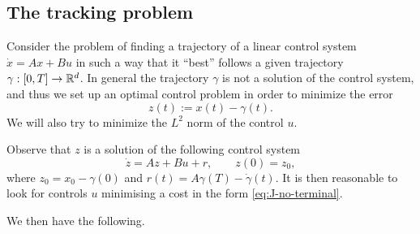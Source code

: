 \subsection{The tracking problem}

Consider the problem of finding a trajectory of a linear control system $\dot x = Ax + Bu$ in such a way that it ``best'' follows a given trajectory $\gamma:[0,T]\to \mathbb{R}^d$. 
In general the trajectory $\gamma$ is not a solution of the control system, and thus we set up an optimal control problem in order to minimize the error 
\begin{equation}
    z(t) := x(t)-\gamma(t).
\end{equation}
We will also try to minimize the $L^2$ norm of the  control $u$.


Observe that $z$ is a solution of the following control system
\begin{equation}
    \label{eq:z-system}
    \dot z = A z + Bu + r, \qquad z(0) = z_0,
\end{equation}
where $z_0 = x_0-\gamma(0)$ and $r(t) = A\gamma(T)-\dot\gamma(t)$. It is then reasonable to look for controls $u$ minimising a cost in the form \eqref{eq:J-no-terminal}. 
% 


We then have the following.


